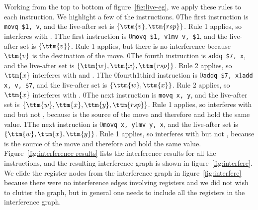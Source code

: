 \documentclass[7x10]{TimesAPriori_MIT}%
\def\racketEd{0}
\def\pythonEd{1}
\def\edition{1}
\def\xeightysixEd{0}
\def\riscvEd{1}
\def\architecture{1}
\newcommand\ifriscv[1]{\if\architecture\riscvEd{#1}\fi}
\newcommand\ifxeightsix[1]{\if\architecture\xeightysixEd{#1}\fi}
\newcommand{\racket}[1]{{\if\edition\racketEd{#1}\fi}}
\newcommand{\pythonColor}[0]{}
\newcommand{\python}[1]{{\if\edition\pythonEd\pythonColor #1\fi}}
\numberwithin{theorem}{chapter}
\numberwithin{definition}{chapter}
\numberwithin{equation}{chapter}
\begin{document}
Working from the top to bottom of figure~\ref{fig:live-eg}, we apply
these rules to each instruction. We highlight a few of the
instructions.
\racket{The first instruction is \lstinline{movq $1, v},
  and the live-after set is $\{\ttm{v},\ttm{rsp}\}$. Rule 1 applies,
  so \code{v} interferes with \code{rsp}.}
%
\python{The first instruction is
  \ifxeightsix{\lstinline{movq $1, v}}\ifriscv{\lstinline{mv v, $1}}, and the
  live-after set is $\{\ttm{v}\}$. Rule 1 applies, but there is
  no interference because $\ttm{v}$ is the destination of the move.}
%
\racket{The fourth instruction is \lstinline{addq $7, x}, and the
  live-after set is $\{\ttm{w},\ttm{x},\ttm{rsp}\}$. Rule 2 applies, so
  $\ttm{x}$ interferes with  and \ttm{rsp}.}
%
\python{The \ifxeightsix{fourth}\ifriscv{third} instruction is
  \ifxeightsix{\lstinline{addq $7, x}}\ifriscv{\lstinline{add x, v, $7}}, and the
  live-after set is $\{\ttm{w},\ttm{x}\}$. Rule 2 applies, so
  $$ interferes with .}
%
\racket{The next instruction is \lstinline{movq x, y}, and the
  live-after set is $\{\ttm{w},\ttm{x},\ttm{y},\ttm{rsp}\}$. Rule 1
  applies, so \ttm{y} interferes with \ttm{w} and \ttm{rsp} but not
  \ttm{x}, because \ttm{x} is the source of the move and therefore
   and  hold the same value.}
%
\python{The next instruction is
  \ifxeightsix{\lstinline{movq x, y}}\ifriscv{\lstinline{mv y, x}}, and the
  live-after set is $\{\ttm{w},\ttm{x},\ttm{y}\}$. Rule 1
  applies, so \ttm{y} interferes with \ttm{w} but not
  \ttm{x}, because \ttm{x} is the source of the move and therefore
  \ttm{x} and \ttm{y} hold the same value.}
%
Figure~\ref{fig:interference-results} lists the interference results
for all the instructions, and the resulting interference graph is
shown in figure~\ref{fig:interfere}. We elide the register nodes from
the interference graph in figure~\ref{fig:interfere} because there
were no interference edges involving registers and we did not wish to
clutter the graph, but in general one needs to include all the
registers in the interference graph.
\end{document}
